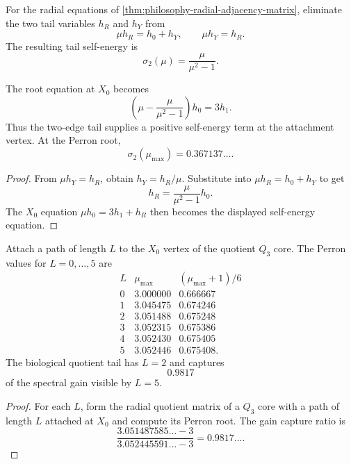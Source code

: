 \begin{definition}
\label{def:philosophy-tail-self-energy}
For the radial equations of
\autoref{thm:philosophy-radial-adjacency-matrix}, eliminate the two tail
variables $h_{R}$ and $h_{Y}$ from
$$
  \mu h_{R}=h_{0}+h_{Y},
  \qquad
  \mu h_{Y}=h_{R}.
$$
The resulting tail self-energy is
$$
  \sigma_{2}(\mu)=\frac{\mu}{\mu^{2}-1}.
$$
\end{definition}

\begin{theorem}
\label{thm:philosophy-positive-tail-self-energy}
The root equation at $X_{0}$ becomes
$$
  \left(\mu-\frac{\mu}{\mu^{2}-1}\right)h_{0}=3h_{1}.
$$
Thus the two-edge tail supplies a positive self-energy term at the
attachment vertex. At the Perron root,
$$
  \sigma_{2}(\mu_{\max})=0.367137\ldots.
$$
\end{theorem}
\begin{proof}
From $\mu h_{Y}=h_{R}$, obtain $h_{Y}=h_{R}/\mu$. Substitute into
$\mu h_{R}=h_{0}+h_{Y}$ to get
$$
  h_{R}=\frac{\mu}{\mu^{2}-1}h_{0}.
$$
The $X_{0}$ equation $\mu h_{0}=3h_{1}+h_{R}$ then becomes the displayed
self-energy equation.
\end{proof}

\begin{theorem}
\label{thm:philosophy-tail-length-spectral-response}
Attach a path of length $L$ to the $X_{0}$ vertex of the quotient
$Q_{3}$ core. The Perron values for $L=0,\ldots,5$ are
$$
\begin{array}{c|r|r}
  L & \mu_{\max} & (\mu_{\max}+1)/6\\
  \hline
  0 & 3.000000 & 0.666667\\
  1 & 3.045475 & 0.674246\\
  2 & 3.051488 & 0.675248\\
  3 & 3.052315 & 0.675386\\
  4 & 3.052430 & 0.675405\\
  5 & 3.052446 & 0.675408.
\end{array}
$$
The biological quotient tail has $L=2$ and captures
$$
  0.9817
$$
of the spectral gain visible by $L=5$.
\end{theorem}
\begin{proof}
For each $L$, form the radial quotient matrix of a $Q_{3}$ core with a
path of length $L$ attached at $X_{0}$ and compute its Perron root. The
gain capture ratio is
$$
  \frac{3.051487585\ldots-3}{3.052445591\ldots-3}=0.9817\ldots.
$$
\end{proof}

